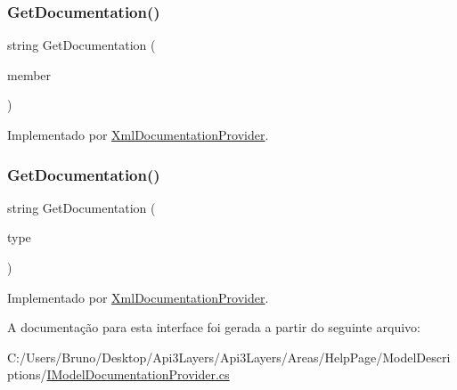 \subsubsection{\texorpdfstring{Get\+Documentation()}{GetDocumentation()}\hspace{0.1cm}{\footnotesize\ttfamily [1/2]}}
{\footnotesize\ttfamily string Get\+Documentation (\begin{DoxyParamCaption}\item[{Member\+Info}]{member }\end{DoxyParamCaption})}



Implementado por \hyperlink{classApi3Layers_1_1Areas_1_1HelpPage_1_1XmlDocumentationProvider_aa774bb352a769421583abb335a1cec8a}{Xml\+Documentation\+Provider}.

\mbox{\label{interfaceApi3Layers_1_1Areas_1_1HelpPage_1_1ModelDescriptions_1_1IModelDocumentationProvider_af771cd863288942e506d28447daf4f82}} 
\subsubsection{\texorpdfstring{Get\+Documentation()}{GetDocumentation()}\hspace{0.1cm}{\footnotesize\ttfamily [2/2]}}
{\footnotesize\ttfamily string Get\+Documentation (\begin{DoxyParamCaption}\item[{Type}]{type }\end{DoxyParamCaption})}



Implementado por \hyperlink{classApi3Layers_1_1Areas_1_1HelpPage_1_1XmlDocumentationProvider_af771cd863288942e506d28447daf4f82}{Xml\+Documentation\+Provider}.



A documentação para esta interface foi gerada a partir do seguinte arquivo\+:\begin{DoxyCompactItemize}
\item 
C\+:/\+Users/\+Bruno/\+Desktop/\+Api3\+Layers/\+Api3\+Layers/\+Areas/\+Help\+Page/\+Model\+Descriptions/\hyperlink{IModelDocumentationProvider_8cs}{I\+Model\+Documentation\+Provider.\+cs}\end{DoxyCompactItemize}

